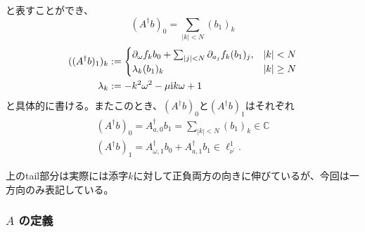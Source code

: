 と表すことができ、
$$
    (A^\dagger b)_0 = \sum_{|k|<N} (b_1)_k
$$
\footnotesize
\begin{align*}
    ((A^\dagger b)_1 )_k &:= 
    \begin{cases}
    \partial_\omega f_k b_0 + \sum_{|j|<N} \partial_{a_j} f_k (b_1 )_j, &|k| < N  \\
    \lambda_k (b_1)_k &|k| \ge N
    \end{cases} \\
    \lambda_k &:= -k^2 \omega^2 - \mu \mathrm{i} k \omega + 1
\end{align*}
\normalsize
と具体的に書ける。またこのとき、$(A^\dagger b)_0$と$(A^\dagger b)_1$はそれぞれ
    \begin{align*}
    (A^\dagger b)_0 = A^\dagger_{a,0} b_1 = \sum_{|k|<N} (b_1)_k \in \mathbb{C} \\
    (A^\dagger b)_1 = A^\dagger_{\omega, 1} b_0 + A^\dagger_{a,1} b_1 \in \ell^1_{\nu^\prime}.
    \end{align*}

\begin{rem}
上のtail部分は実際には添字$k$に対して正負両方の向きに伸びているが、今回は一方向のみ表記している。
\end{rem}

\subsubsection{$A$ の定義}

